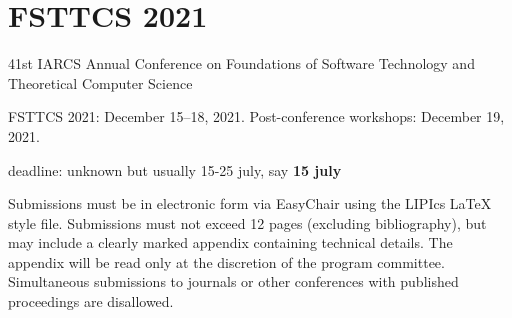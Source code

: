 \documentclass[a4paper,final]{article}
\theoremstyle{definition}
\begin{document}
\section{FSTTCS 2021}  
41st IARCS Annual Conference on
Foundations of Software Technology and Theoretical Computer Science

    FSTTCS 2021: December 15–18, 2021.
    Post-conference workshops: December 19, 2021.

deadline: unknown but usually 15-25 july, say {\bf 15 july}

Submissions must be in electronic form via EasyChair using the LIPIcs LaTeX style file. Submissions must not exceed 12 pages (excluding bibliography), but may include a clearly marked appendix containing technical details. The appendix will be read only at the discretion of the program committee. Simultaneous submissions to journals or other conferences with published proceedings are disallowed. 




\end{document}
